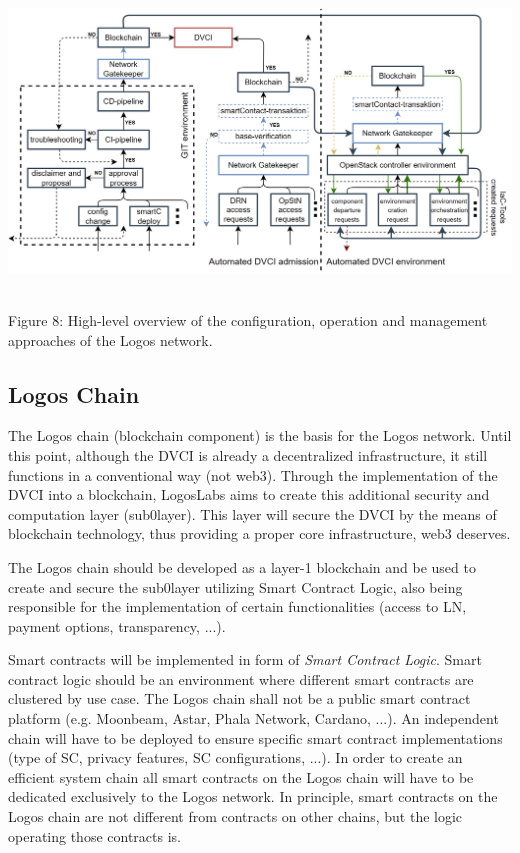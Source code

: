 \documentclass[]{article}
\begin{document}
\begin{center}
	\includegraphics[height=8cm]{configuration-operation-management-approach}
\end{center}
\begin{center}
	Figure 8: High-level overview of the configuration, operation and management approaches of the Logos network.
\end{center}

\subsection{Logos Chain}
The Logos chain (blockchain component) is the basis for the Logos network. 
Until this point, although the DVCI is already a decentralized infrastructure, it still functions in a conventional way (not web3).
Through the implementation of the DVCI into a blockchain, LogosLabs aims to create this additional security and computation layer (sub0layer). 
This layer will secure the DVCI by the means of blockchain technology, thus providing a proper core infrastructure, web3 deserves.

The Logos chain should be developed as a layer-1 blockchain and be used to create and secure the sub0layer utilizing Smart Contract Logic, also being responsible for the implementation of certain functionalities (access to LN, payment options, transparency, ...).

Smart contracts will be implemented in form of \textit{Smart Contract Logic}.
Smart contract logic should be an environment where different smart contracts are clustered by use case.
The Logos chain shall not be a public smart contract platform (e.g. Moonbeam, Astar, Phala Network, Cardano, ...).
An independent chain will have to be deployed to ensure specific smart contract implementations (type of SC, privacy features, SC configurations, ...). 
In order to create an efficient system chain all smart contracts on the Logos chain will have to be dedicated exclusively to the Logos network.
In principle, smart contracts on the Logos chain are not different from contracts on other chains, but the logic operating those contracts is.
\end{document}
